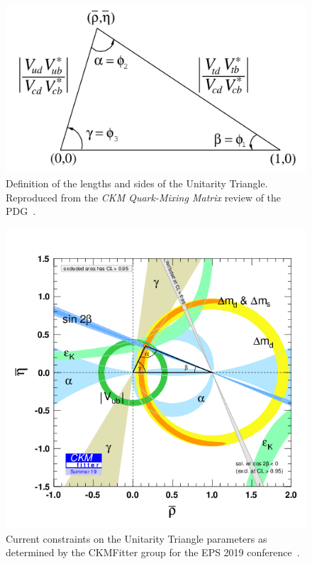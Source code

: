 \begin{figure}[tb]
    \centering
    \includegraphics[width=0.7\columnwidth]{figures/theory/UT_definition.png}
    \caption{Definition of the lengths and sides of the Unitarity Triangle. Reproduced from the \emph{CKM Quark-Mixing Matrix} review of the PDG~\cite{PDG2020}.}
    \label{fig:UT_definition}
\end{figure}

\begin{figure}[tb]
    \centering
    \includegraphics[width=0.7\columnwidth]{figures/theory/rhoeta_large.png}
    \caption{Current constraints on the Unitarity Triangle parameters as determined by the CKMFitter group for the EPS 2019 conference~\cite{CKMfitter2015}.}
    \label{fig:UT_constraints}
\end{figure}

